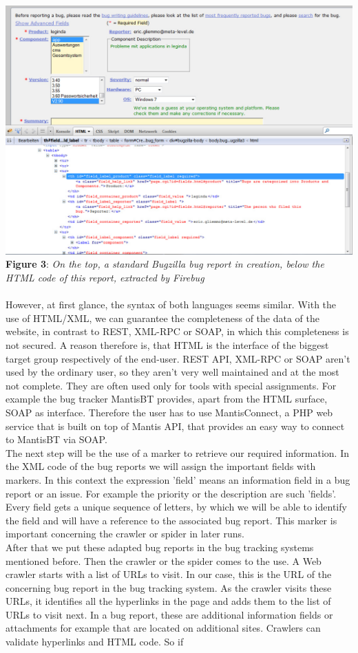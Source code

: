 \\\includegraphics[width=1.0\textwidth]{Screenshot_bugzilla_html2.jpg}  \\\textbf{Figure 3}: \textit{On the top, a standard Bugzilla bug report in creation, below the HTML code of this report, extracted by Firebug}  \\ \\ However, at first glance, the syntax of both languages seems similar. With the use of HTML/XML, we can guarantee the completeness of the data of the website, in contrast to REST, XML-RPC or SOAP, in which this completeness is not secured. A reason therefore is, that HTML is the interface of the biggest target group respectively of the end-user. REST API, XML-RPC or SOAP aren't used by the ordinary user, so they aren't very well maintained and at the most not complete. They are often used only for tools with special assignments. For example the bug tracker MantisBT provides, apart from the HTML surface, SOAP as interface. Therefore the user has to use MantisConnect, a PHP web service that is built on top of Mantis API, that provides an easy way to connect to MantisBT via SOAP.   \\ The next step will be the use of a marker to retrieve our required information. In the XML code of the bug reports we will assign the important fields with markers. In this context the expression 'field' means an information field in a bug report or an issue. For example the priority or the description are such 'fields'. Every field gets a unique sequence of letters, by which we will be able to identify the field and will have a reference to the associated bug report. This marker is important concerning the crawler or spider in later runs. \\After that we put these adapted bug reports in the bug tracking systems mentioned before. Then the crawler or the spider comes to the use. A Web crawler starts with a list of URLs to visit. In our case, this is the URL of the concerning bug report in the bug tracking system. As the crawler visits these URLs, it identifies all the hyperlinks in the page and adds them to the list of URLs to visit next. In a bug report, these are additional information fields or attachments for example that are located on additional sites. Crawlers can validate hyperlinks and HTML code. So if 